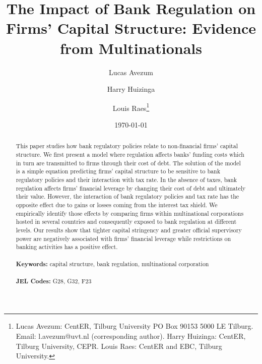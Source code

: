 \documentclass[12pt]{article}
\begin{document}
	
	\begin{titlepage}
		\title{The Impact of Bank Regulation on  Firms' Capital Structure: Evidence from Multinationals}
		
		\author{Lucas Avezum \and Harry Huizinga \and Louis Raes\thanks{Lucas Avezum: CentER, Tilburg University PO Box 90153 5000 LE Tilburg. Email:
				l.avezum@uvt.nl (corresponding author). Harry Huizinga: CentER, Tilburg University, CEPR. Louis Raes: CentER and EBC, Tilburg University.}}
		\date{\today}
		\maketitle
		\begin{abstract}
			\noindent This paper studies how bank regulatory policies relate to non-financial firms' capital structure. We first present a model where regulation affects banks' funding costs which in turn are transmitted to firms through their cost of debt. The solution of the model is a simple equation predicting firms' capital structure to be sensitive to bank regulatory policies and their interaction with tax rate. In the absence of taxes, bank regulation affects firms' financial leverage by changing their cost of debt and ultimately their value. However, the interaction of bank regulatory policies and tax rate has the opposite effect due to gains or losses coming from the interest tax shield. We empirically identify those effects by comparing firms within multinational corporations hosted in several countries and consequently exposed to bank regulation at different levels. Our results show that tighter capital stringency and greater official supervisory power are negatively associated with firms' financial leverage while restrictions on banking activities has a positive effect.   \\
			\vspace{0in}\\
			\noindent\textbf{Keywords:} capital structure, bank regulation, multinational corporation\\
			\vspace{0in}\\
			\noindent\textbf{JEL Codes:} G28, G32, F23 \\
			
			\bigskip
		\end{abstract}
		\setcounter{page}{0}
		\thispagestyle{empty}
	\end{titlepage}
	\pagebreak \newpage
	
	
	\normalem
	
\end{document}
